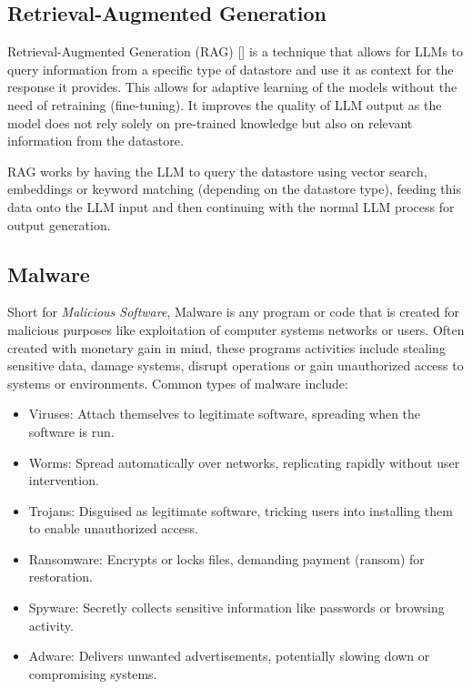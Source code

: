 \subsection{Retrieval-Augmented Generation}
Retrieval-Augmented Generation (RAG)
[\cite{lewis2021retrievalaugmentedgenerationknowledgeintensivenlp}] is a technique that allows for
LLMs to query information from a specific type of datastore and use it as context for the response
it provides. This allows for adaptive learning of the models without the need of retraining
(fine-tuning). It improves the quality of LLM output as the model does not rely solely on
pre-trained knowledge but also on relevant information from the datastore.

RAG works by having the LLM to query the datastore using vector search, embeddings or keyword
matching (depending on the datastore type), feeding this data onto the LLM input and then
continuing with the normal LLM process for output generation.

\subsection{Malware}
Short for \textit{Malicious Software}, Malware is any program or code that is created for malicious
purposes like exploitation of computer systems networks or users. Often created with monetary gain
in mind, these programs activities include stealing sensitive data, damage systems, disrupt
operations or gain unauthorized access to systems or environments. Common types of malware include:
\begin{itemize}
	\item Viruses: Attach themselves to legitimate software, spreading when the software is run.
	\item Worms: Spread automatically over networks, replicating rapidly without user intervention.
	\item Trojans: Disguised as legitimate software, tricking users into installing them to enable
	      unauthorized access.
	\item Ransomware: Encrypts or locks files, demanding payment (ransom) for restoration.
	\item Spyware: Secretly collects sensitive information like passwords or browsing activity.
	\item Adware: Delivers unwanted advertisements, potentially slowing down or compromising systems.
\end{itemize}

